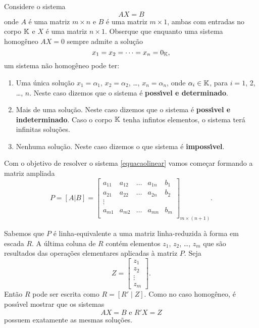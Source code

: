 Considere o sistema
\begin{equation}\label{equacaolinear}
	AX = B
\end{equation}
onde $A$ \'e uma matriz $m \times n$ e $B$ \'e uma matriz $m \times 1$, ambas com entradas no corpo $\mathbb{K}$ e $X$ \'e uma matriz $n \times 1$. Obserque que enquanto uma sistema homog\^eneo $AX = 0$ sempre admite a solu\c{c}\~ao
\[
	x_1 = x_2 = \cdots = x_n = 0_{\mathbb{K}},
\]
um sistema n\~ao homog\^eneo pode ter:
\begin{enumerate}
	\item Uma \'unica solu\c{c}\~ao $x_1 = \alpha_1$, $x_2 = \alpha_2$, \dots, $x_n = \alpha_n$, onde $\alpha_i \in \mathbb{K}$, para $i = 1$, 2, \dots, $n$. Neste caso dizemos que o sistema \'e \textbf{poss{\'\i}vel e determinado}.
	\item Mais de uma solu\c{c}\~ao. Neste caso dizemos que o sistema \'e \textbf{poss{\'\i}vel e indeterminado}. Caso o corpo $\mathbb{K}$ tenha infintos elementos, o sistema ter\'a infinitas solu\c{c}\~oes.
	\item Nenhuma solu\c{c}\~ao. Neste caso dizemos o que sistema \'e \textbf{imposs{\'\i}vel}.
\end{enumerate}

Com o objetivo de resolver o sistema \eqref{equacaolinear} vamos come\c{c}ar formando a matriz ampliada
\[
	P = [A|B] = \begin{bmatrix}
					a_{11} & a_{12} & \dots & a_{1n} & b_1\\
					a_{21} & a_{22} & \dots & a_{2n} & b_2\\
					\vdots\\
					a_{m1} & a_{m2} & \dots & a_{mn} & b_m\\
				\end{bmatrix}_{m \times (n + 1)}.
\]

Sabemos que $P$ \'e linha-equivalente a uma matriz linha-reduzida \`a forma em escada $R$. A \'ultima coluna de $R$ cont\'em elementos $z_1$, $z_2$, \dots, $z_m$ que s\~ao resultados das opera\c{c}\~oes elementares aplicadas \`a matriz $P$. Seja 
\[
	Z = \begin{bmatrix}
			z_1\\
			z_2\\
			\vdots\\
			z_m
		\end{bmatrix}.
\]
Ent\~ao $R$ pode ser escrita como $R = [R' \mid Z]$. Como no caso homog\^eneo, \'e poss{\'\i}vel mostrar que os sistemas
\[
	AX = B \mbox{ e } R'X = Z
\]
possuem exatamente as mesmas solu\c{c}\~oes.

